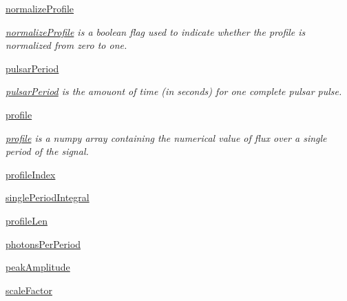 \begin{DoxyCompactItemize}
\hyperlink{classmodest_1_1signals_1_1xraysource_1_1PeriodicXRaySource_ac7490bebcc1d508b7813ea274cc36702}{normalize\+Profile}
\begin{DoxyCompactList}\small\item\em \hyperlink{classmodest_1_1signals_1_1xraysource_1_1PeriodicXRaySource_ac7490bebcc1d508b7813ea274cc36702}{normalize\+Profile} is a boolean flag used to indicate whether the profile is normalized from zero to one. \end{DoxyCompactList}\item 
\hyperlink{classmodest_1_1signals_1_1xraysource_1_1PeriodicXRaySource_aeb6d4a8057d3ee58c81e69fb97b9eef7}{pulsar\+Period}
\begin{DoxyCompactList}\small\item\em \hyperlink{classmodest_1_1signals_1_1xraysource_1_1PeriodicXRaySource_aeb6d4a8057d3ee58c81e69fb97b9eef7}{pulsar\+Period} is the amouont of time (in seconds) for one complete pulsar pulse. \end{DoxyCompactList}\item 
\hyperlink{classmodest_1_1signals_1_1xraysource_1_1PeriodicXRaySource_a50e061bb97d0dd6ab7f344370c6b35a4}{profile}
\begin{DoxyCompactList}\small\item\em \hyperlink{classmodest_1_1signals_1_1xraysource_1_1PeriodicXRaySource_a50e061bb97d0dd6ab7f344370c6b35a4}{profile} is a numpy array containing the numerical value of flux over a single period of the signal. \end{DoxyCompactList}\item 
\hyperlink{classmodest_1_1signals_1_1xraysource_1_1PeriodicXRaySource_aaf45141c09e1fd35c80c49907fa44497}{profile\+Index}
\item 
\hyperlink{classmodest_1_1signals_1_1xraysource_1_1PeriodicXRaySource_ab193c1d52a5bd8b0798bf407abcca72d}{single\+Period\+Integral}
\item 
\hyperlink{classmodest_1_1signals_1_1xraysource_1_1PeriodicXRaySource_a9d4e5488915741b792df74c256782777}{profile\+Len}
\item 
\hyperlink{classmodest_1_1signals_1_1xraysource_1_1PeriodicXRaySource_a25ab09a55afd1da4f019ad580770e5f4}{photons\+Per\+Period}
\item 
\hyperlink{classmodest_1_1signals_1_1xraysource_1_1PeriodicXRaySource_ab9ca2f0588f7e2f23c5301e05070fe99}{peak\+Amplitude}
\item 
\hyperlink{classmodest_1_1signals_1_1xraysource_1_1PeriodicXRaySource_a1f4469f0818f93136c6c228bd6fb5a09}{scale\+Factor}

\end{DoxyCompactItemize}
